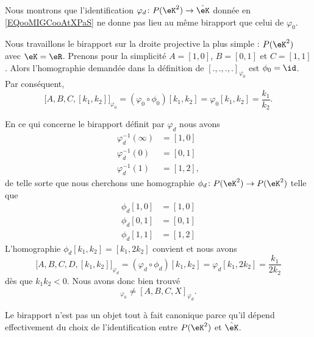 \begin{example}        \label{EXooYCOYooWFSfUv}
	Nous montrons que l'identification \( \varphi_d\colon P(\eK^2)\to \hat\eK\) donnée en \eqref{EQooMIGCooAtXPaS} ne donne pas lieu au même birapport que celui de \( \varphi_0\).

	Nous travaillons le birapport sur la droite projective la plus simple : \( P(\eK^2)\) avec \( \eK=\eR\). Prenons pour la simplicité \( A=[1,0]\), \( B=[0,1]\) et \( C=[1,1]\). Alors l'homographie demandée dans la définition de \( [.,.,.,.]_{\varphi_0}\) est \( \phi_0=\id\). Par conséquent,
	\begin{equation}
		\big[ A,B,C,[k_1,k_2] \big]_{\varphi_0}=(\varphi_0\circ\phi_0)[k_1,k_2]=\varphi_0[k_1,k_2]=\frac{ k_1 }{ k_2 }.
	\end{equation}

	En ce qui concerne le birapport définit par \( \varphi_d\) nous avons
	\begin{subequations}
		\begin{align}
			\varphi_d^{-1}(\infty) & =[1,0]  \\
			\varphi_d^{-1}(0)      & =[0,1]  \\
			\varphi_d^{-1}(1)      & =[1,2],
		\end{align}
	\end{subequations}
	de telle sorte que nous cherchons une homographie \( \phi_d\colon P(\eK^2)\to P(\eK^2)\) telle que
	\begin{subequations}
		\begin{align}
			\phi_d[1,0] & =[1,0] \\
			\phi_d[0,1] & =[0,1] \\
			\phi_d[1,1] & =[1,2]
		\end{align}
	\end{subequations}
	L'homographie \( \phi_d[k_1,k_2]=[k_1,2k_2]\) convient et nous avons
	\begin{equation}
		\big[ A,B,C,D,[k_1,k_2] \big]_{\varphi_d}=(\varphi_d\circ\phi_d)[k_1,k_2]=\varphi_d[k_1,2k_2]=\frac{ k_1 }{ 2k_2 }
	\end{equation}
	dès que \( k_1k_2<0\). Nous avons donc bien trouvé
	\begin{equation}
		[A,B,C,X]_{\varphi_0}\neq [A,B,C,X]_{\varphi_d}.
	\end{equation}
\end{example}

Le birapport n'est pas un objet tout à fait canonique parce qu'il dépend effectivement du choix de l'identification entre \( P(\eK^2)\) et \( \hat\eK\).

